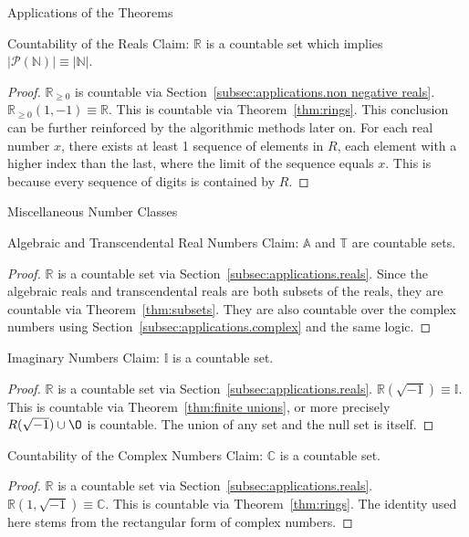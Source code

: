 \documentclass[12pt]{article}
\begin{document}
\begin{section}{Applications of the Theorems}
	\pagebreak\begin{subsection}{Countability of the Reals}\label{subsec:applications.reals}
		Claim: $\mathbb R$ is a countable set which implies
		$\left|\mathcal P(\mathbb N)\right|\equiv\left|\mathbb N\right|$.
		\begin{proof}
			$\mathbb R_{\ge 0}$ is countable via Section~\ref{subsec:applications.non negative reals}.
			$\mathbb R_{\ge0}(1, -1)\equiv\mathbb R$. This is countable via Theorem~\ref{thm:rings}.
			This conclusion can be further reinforced by the algorithmic methods later on. For each
			real number $x$, there exists at least 1 sequence of elements in $R$, each element with a
			higher index than the last, where the limit of the sequence equals $x$. This is because
			every sequence of digits is contained by $R$.
		\end{proof}
	\end{subsection}

	\begin{subsection}{Miscellaneous Number Classes}\label{subsec:applications.miscellaneous}
		\begin{subsubsection}{Algebraic and Transcendental Real Numbers}
			\label{subsubsec:applications.misc.reals}
			Claim: $\mathbb A$ and $\mathbb T$ are countable sets.
			\begin{proof}
				$\mathbb R$ is a countable set via Section~\ref{subsec:applications.reals}.
				Since the algebraic reals and transcendental reals are both subsets of the
				reals, they are countable via Theorem~\ref{thm:subsets}. They are also
				countable over the complex numbers using Section~\ref{subsec:applications.complex}
				and the same logic.
			\end{proof}
		\end{subsubsection}

		\begin{subsubsection}{Imaginary Numbers}\label{subsubsec:applications.misc.imaginary}
			Claim: $\mathbb I$ is a countable set.
			\begin{proof}
				$\mathbb R$ is a countable set via Section~\ref{subsec:applications.reals}.
				$\mathbb R(\sqrt{-1})\equiv\mathbb I$. This is countable via
				Theorem~\ref{thm:finite unions}, or more precisely $R(\sqrt{-1})\cup\O$
				is countable. The union of any set and the null set is itself.
			\end{proof}
		\end{subsubsection}
	\end{subsection}

	\begin{subsection}{Countability of the Complex Numbers}\label{subsec:applications.complex}
		Claim: $\mathbb C$ is a countable set.
		\begin{proof}
			$\mathbb R$ is a countable set via Section~\ref{subsec:applications.reals}.
			$\mathbb R(1, \sqrt{-1})\equiv\mathbb C$. This is countable via Theorem~\ref{thm:rings}.
			The identity used here stems from the rectangular form of complex numbers.
		\end{proof}
	\end{subsection}
\end{section}
\end{document}
